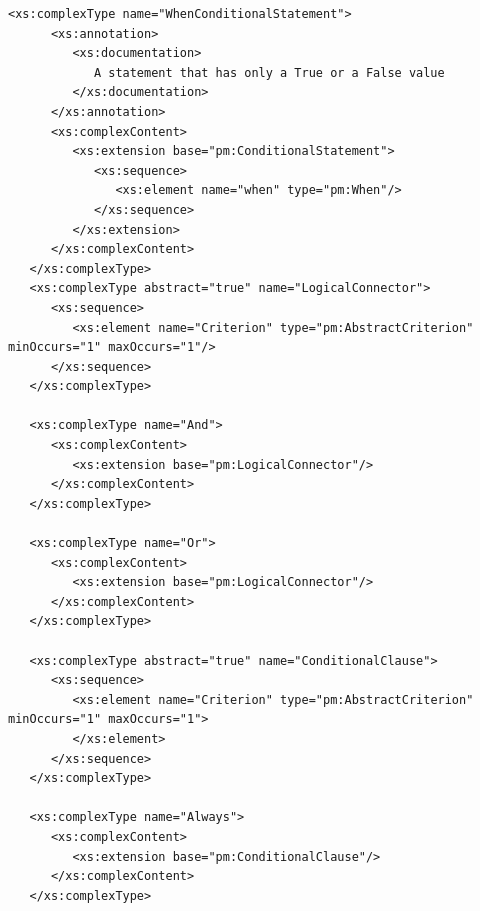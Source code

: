 \documentclass[a4paper,11pt] {ivoa}
\begin{document}
\begin{lstlisting}[style=listXML]
   <xs:complexType name="WhenConditionalStatement">
      <xs:annotation>
         <xs:documentation>
            A statement that has only a True or a False value
         </xs:documentation>
      </xs:annotation>
      <xs:complexContent>
         <xs:extension base="pm:ConditionalStatement">
            <xs:sequence>
               <xs:element name="when" type="pm:When"/>
            </xs:sequence>
         </xs:extension>
      </xs:complexContent>
   </xs:complexType>
   <xs:complexType abstract="true" name="LogicalConnector">
      <xs:sequence>
         <xs:element name="Criterion" type="pm:AbstractCriterion" minOccurs="1" maxOccurs="1"/>
      </xs:sequence>
   </xs:complexType>

   <xs:complexType name="And">
      <xs:complexContent>
         <xs:extension base="pm:LogicalConnector"/>
      </xs:complexContent>
   </xs:complexType>

   <xs:complexType name="Or">
      <xs:complexContent>
         <xs:extension base="pm:LogicalConnector"/>
      </xs:complexContent>
   </xs:complexType>

   <xs:complexType abstract="true" name="ConditionalClause">
      <xs:sequence>
         <xs:element name="Criterion" type="pm:AbstractCriterion" minOccurs="1" maxOccurs="1">
         </xs:element>
      </xs:sequence>
   </xs:complexType>

   <xs:complexType name="Always">
      <xs:complexContent>
         <xs:extension base="pm:ConditionalClause"/>
      </xs:complexContent>
   </xs:complexType>


\end{lstlisting}
\end{document}
